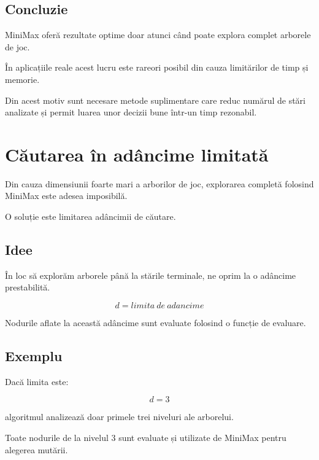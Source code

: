 \documentclass[12pt,a4paper]{article}
\begin{document}
\subsection{Concluzie}

MiniMax oferă rezultate optime doar atunci când poate explora complet arborele de joc.

În aplicațiile reale acest lucru este rareori posibil din cauza limitărilor de timp și memorie.

Din acest motiv sunt necesare metode suplimentare care reduc numărul de stări analizate și permit luarea unor decizii bune într-un timp rezonabil.


















\section{Căutarea în adâncime limitată}

Din cauza dimensiunii foarte mari a arborilor de joc, explorarea completă folosind MiniMax este adesea imposibilă.

O soluție este limitarea adâncimii de căutare.

\subsection{Idee}

În loc să explorăm arborele până la stările terminale, ne oprim la o adâncime prestabilită.

\[
d = limita\ de\ adancime
\]

Nodurile aflate la această adâncime sunt evaluate folosind o funcție de evaluare.

\subsection{Exemplu}

Dacă limita este:

\[
d = 3
\]

algoritmul analizează doar primele trei niveluri ale arborelui.

Toate nodurile de la nivelul 3 sunt evaluate și utilizate de MiniMax pentru alegerea mutării.
\end{document}
